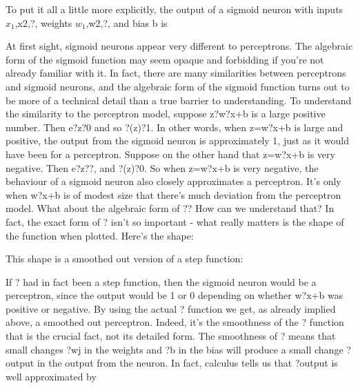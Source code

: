 To put it all a little more explicitly, the output of a sigmoid neuron with inputs $x_1$,x2,?, weights $w_1$,w2,?, and bias b is 

At first sight, sigmoid neurons appear very different to perceptrons. The algebraic form of the sigmoid function may seem opaque and forbidding if you're not already familiar with it. In fact, there are many similarities between perceptrons and sigmoid neurons, and the algebraic form of the sigmoid function turns out to be more of a technical detail than a true barrier to understanding.
To understand the similarity to the perceptron model, suppose z?w?x+b is a large positive number. Then e?z?0 and so ?(z)?1. In other words, when z=w?x+b is large and positive, the output from the sigmoid neuron is approximately 1, just as it would have been for a perceptron. Suppose on the other hand that z=w?x+b is very negative. Then e?z??, and ?(z)?0. So when z=w?x+b is very negative, the behaviour of a sigmoid neuron also closely approximates a perceptron. It's only when w?x+b is of modest size that there's much deviation from the perceptron model.
What about the algebraic form of ?? How can we understand that? In fact, the exact form of ? isn't so important - what really matters is the shape of the function when plotted. Here's the shape:

This shape is a smoothed out version of a step function:


If ? had in fact been a step function, then the sigmoid neuron would be a perceptron, since the output would be 1 or 0 depending on whether w?x+b was positive or negative. By using the actual ? function we get, as already implied above, a smoothed out perceptron. Indeed, it's the smoothness of the ? function that is the crucial fact, not its detailed form. The smoothness of ? means that small changes ?wj in the weights and ?b in the bias will produce a small change ?output in the output from the neuron. In fact, calculus tells us that ?output is well approximated by 

